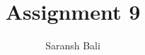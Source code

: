 \documentclass[journal,12pt,twocolumn]{IEEEtran}
\begin{document}
\makeatletter
{}
\makeatother
\let\StandardTheFigure\thefigure
\let\vec\mathbf
\renewcommand{\thefigure}{\theproblem}
\def\putbox#1#2#3{\makebox[0in][l]{\makebox[#1][l]{}\raisebox{\baselineskip}[0in][0in]{\raisebox{#2}[0in][0in]{#3}}}}
     \def\rightbox#1{\makebox[0in][r]{#1}}
     \def\centbox#1{\makebox[0in]{#1}}
     \def\topbox#1{\raisebox{-\baselineskip}[0in][0in]{#1}}
     \def\midbox#1{\raisebox{-0.5\baselineskip}[0in][0in]{#1}}
\vspace{3cm}
\title{Assignment 9}
\author{Saransh Bali}
%
%
%
% 
%
\end{document}
